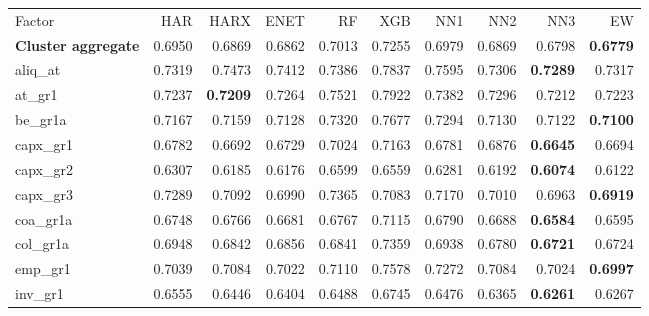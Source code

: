 \begin{longtable}{>{\raggedright\arraybackslash}p{2.6cm}rrrrrrrrr}
\hline
\multicolumn{10}{@{}l}{\textit{Panel C. Investment}} \\
\hline
Factor & HAR & HARX & ENET & RF & XGB & NN1 & NN2 & NN3 & EW \\
\hline
\textbf{Cluster aggregate} & 0.6950 & \cellcolor{blue!10}0.6869 & \cellcolor{blue!10}0.6862 & 0.7013 & 0.7255 & 0.6979 & \cellcolor{blue!10}0.6869 & \cellcolor{blue!10}0.6798 & \textbf{\cellcolor{blue!10}0.6779} \\
aliq\_at & 0.7319 & 0.7473 & 0.7412 & 0.7386 & 0.7837 & 0.7595 & \cellcolor{blue!10}0.7306 & \textbf{\cellcolor{blue!10}0.7289} & \cellcolor{blue!10}0.7317 \\
at\_gr1 & 0.7237 & \textbf{\cellcolor{blue!10}0.7209} & 0.7264 & 0.7521 & 0.7922 & 0.7382 & 0.7296 & \cellcolor{blue!10}0.7212 & \cellcolor{blue!10}0.7223 \\
be\_gr1a & 0.7167 & \cellcolor{blue!10}0.7159 & \cellcolor{blue!10}0.7128 & 0.7320 & 0.7677 & 0.7294 & \cellcolor{blue!10}0.7130 & \cellcolor{blue!10}0.7122 & \textbf{\cellcolor{blue!10}0.7100} \\
capx\_gr1 & 0.6782 & \cellcolor{blue!10}0.6692 & \cellcolor{blue!10}0.6729 & 0.7024 & 0.7163 & \cellcolor{blue!10}0.6781 & 0.6876 & \textbf{\cellcolor{blue!10}0.6645} & \cellcolor{blue!10}0.6694 \\
capx\_gr2 & 0.6307 & \cellcolor{blue!10}0.6185 & \cellcolor{blue!10}0.6176 & 0.6599 & 0.6559 & \cellcolor{blue!10}0.6281 & \cellcolor{blue!10}0.6192 & \textbf{\cellcolor{blue!10}0.6074} & \cellcolor{blue!10}0.6122 \\
capx\_gr3 & 0.7289 & \cellcolor{blue!10}0.7092 & \cellcolor{blue!10}0.6990 & 0.7365 & \cellcolor{blue!10}0.7083 & \cellcolor{blue!10}0.7170 & \cellcolor{blue!10}0.7010 & \cellcolor{blue!10}0.6963 & \textbf{\cellcolor{blue!10}0.6919} \\
coa\_gr1a & 0.6748 & 0.6766 & \cellcolor{blue!10}0.6681 & 0.6767 & 0.7115 & 0.6790 & \cellcolor{blue!10}0.6688 & \textbf{\cellcolor{blue!10}0.6584} & \cellcolor{blue!10}0.6595 \\
col\_gr1a & 0.6948 & \cellcolor{blue!10}0.6842 & \cellcolor{blue!10}0.6856 & \cellcolor{blue!10}0.6841 & 0.7359 & \cellcolor{blue!10}0.6938 & \cellcolor{blue!10}0.6780 & \textbf{\cellcolor{blue!10}0.6721} & \cellcolor{blue!10}0.6724 \\
emp\_gr1 & 0.7039 & 0.7084 & \cellcolor{blue!10}0.7022 & 0.7110 & 0.7578 & 0.7272 & 0.7084 & \cellcolor{blue!10}0.7024 & \textbf{\cellcolor{blue!10}0.6997} \\
inv\_gr1 & 0.6555 & \cellcolor{blue!10}0.6446 & \cellcolor{blue!10}0.6404 & \cellcolor{blue!10}0.6488 & 0.6745 & \cellcolor{blue!10}0.6476 & \cellcolor{blue!10}0.6365 & \textbf{\cellcolor{blue!10}0.6261} & \cellcolor{blue!10}0.6267 \\

\end{longtable}
